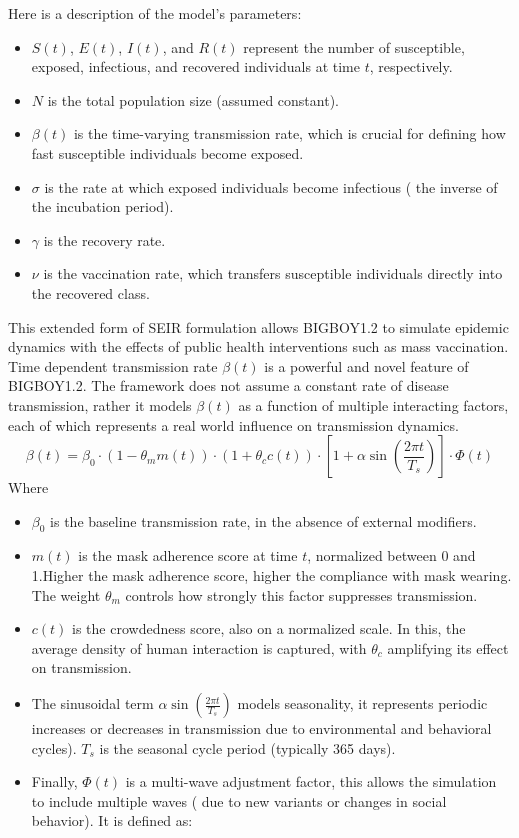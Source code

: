 \documentclass[11pt,a4paper]{article}
\theoremstyle{remark}\newtheorem{remark}{Remark}
\begin{document}
Here is a description of the model's parameters:
\begin{itemize}
    \item $S(t)$, $E(t)$, $I(t)$, and $R(t)$ represent the number of susceptible, exposed, infectious, and recovered individuals at time $t$, respectively.
    \item $N$ is the total population size (assumed constant).
    \item $\beta(t)$ is the time-varying transmission rate, which is crucial for defining how fast susceptible individuals become exposed.
    \item $\sigma$ is the rate at which exposed individuals become infectious ( the inverse of the incubation period).
    \item $\gamma$ is the recovery rate.
    \item $\nu$ is the vaccination rate, which transfers susceptible individuals directly into the recovered class.
\end{itemize}
This extended form of SEIR formulation allows BIGBOY1.2 to simulate epidemic dynamics with the effects of public health interventions such as mass vaccination. \\
Time dependent transmission rate $\beta(t)$ is a powerful and novel feature of BIGBOY1.2. The framework does not assume a constant rate of disease transmission, rather it models $\beta(t)$ as a function of multiple interacting factors, each of which represents a real world influence on transmission dynamics. 
\begin{equation} \label{eq:beta_t_definition}
\beta(t) = \beta_0 \cdot (1 - \theta_m m(t)) \cdot (1 + \theta_c c(t)) \cdot \left[ 1 + \alpha \sin\left(\frac{2\pi t}{T_s}\right) \right] \cdot \Phi(t)
\end{equation}
Where 
\begin{itemize}
    \item $\beta_0$ is the baseline transmission rate, in the absence of external modifiers.
    \item $m(t)$ is the mask adherence score at time $t$, normalized between 0 and 1.Higher the mask adherence score, higher the compliance with mask wearing. The weight $\theta_m$ controls how strongly this factor suppresses transmission.
    \item $c(t)$ is the crowdedness score, also on a normalized scale. In this, the average density of human interaction is captured, with $\theta_c$ amplifying its effect on transmission.
    \item The sinusoidal term $\alpha \sin\left( \frac{2 \pi t}{T_s} \right)$ models seasonality, it represents periodic increases or decreases in transmission due to environmental and behavioral cycles). $T_s$ is the seasonal cycle period (typically 365 days).
    \item Finally, $\Phi(t)$ is a multi-wave adjustment factor, this allows the simulation to include multiple waves ( due to new variants or changes in social behavior). It is defined as:
\end{itemize}
\end{document}
